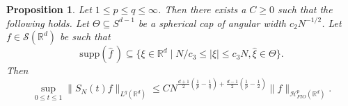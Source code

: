 \documentclass{amsart}
\numberwithin{equation}{section}
\newtheorem{proposition}[theorem]{Proposition}
\theoremstyle{definition}
\newcommand{\R}{\mathbb{R}}
\newcommand{\Rd}{\mathbb{R}^{d}}
\newcommand {\HT}{\mathcal{H}}
\newcommand {\Sw}{\mathcal{S}}
\newcommand {\supp}{\mathrm{supp}}
\newcommand {\wh}{\widehat}
\begin{document}
\begin{proposition}\label{prop:bilinearinfty}
Let $1\leq p\leq q\leq \infty$. %
Then there exists a $C\geq0$ such that the following holds. Let $\Theta\subseteq S^{d-1}$ be a spherical cap of angular width $c_{2}N^{-1/2}$. Let $f\in\Sw(\Rd)$ be such that
\begin{equation}\label{eq:bilinearinftyassume}
\supp(\wh{f}\,)\subseteq\{\xi\in\Rd\mid N/c_{3}\leq |\xi|\leq c_{3}N,\hat{\xi}\in \Theta\}.
\end{equation}
Then
\[
\sup_{0\leq t\leq 1}\| S_{N}(t)f\|_{L^{q}(\R^d)} \leq C  N^{\frac{d+1}{2}(\frac{1}{p}-\frac{1}{q})+\frac{d-1}{2}(\frac{1}{p}-\frac{1}{2})}\|f\|_{\HT^{p}_{FIO}(\Rd)}.
\]
\end{proposition}
\end{document}
